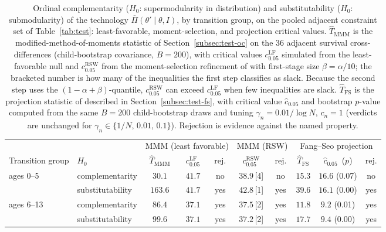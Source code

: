 \begin{table}[htbp]
\centering\small
\begin{tabular}{@{}llcccccccc@{}}
\toprule
 & & \multicolumn{3}{c}{MMM (least favorable)} & \multicolumn{2}{c}{MMM (RSW)} & \multicolumn{3}{c}{Fang--Seo projection} \\
\cmidrule(lr){3-5}\cmidrule(lr){6-7}\cmidrule(lr){8-10}
Transition group & $H_0$ & $\hat T_{\mathrm{MMM}}$ & $c^{\mathrm{LF}}_{0.05}$ & rej. & $c^{\mathrm{RSW}}_{0.05}$ & rej. & $\hat T_{\mathrm{FS}}$ & $\hat c_{0.05}$ \,($p$) & rej. \\ \midrule
ages 0--5 & complementarity & $30.1$ & $41.7$ & no & $38.9$\,[4] & no & $15.3$ & $16.6$ (0.07) & no \\
 & substitutability & $163.6$ & $41.7$ & yes & $42.8$\,[1] & yes & $39.6$ & $16.1$ (0.00) & yes \\
\midrule
ages 6--13 & complementarity & $86.4$ & $37.1$ & yes & $37.5$\,[2] & yes & $11.8$ & $9.2$ (0.01) & yes \\
 & substitutability & $99.6$ & $37.1$ & yes & $37.2$\,[2] & yes & $17.7$ & $9.4$ (0.00) & yes \\
\bottomrule
\end{tabular}
\caption{Ordinal complementarity ($H_0$: supermodularity in distribution) and substitutability ($H_0$: submodularity) of the technology $\overline\Pi(\theta'\mid\theta,I)$, by transition group, on the pooled adjacent constraint set of Table~\ref{tab:test}: least-favorable, moment-selection, and projection critical values. $\hat T_{\mathrm{MMM}}$ is the modified-method-of-moments statistic of
Section~\ref{subsec:test-oc} on the 36 adjacent survival cross-differences
(child-bootstrap covariance, $B=200$), with critical values $c^{\mathrm{LF}}_{0.05}$
simulated from the least-favorable null and $c^{\mathrm{RSW}}_{0.05}$ from the
moment-selection refinement of \citet{Romano_Shaikh_Wolf-2014-ECTA} with first-stage size
$\beta=\alpha/10$; the bracketed number is how many of the inequalities the first step
classifies as slack. Because the second step uses the $(1-\alpha+\beta)$-quantile,
$c^{\mathrm{RSW}}_{0.05}$ can exceed $c^{\mathrm{LF}}_{0.05}$ when few inequalities are
slack. $\hat T_{\mathrm{FS}}$ is the projection statistic of
\citet{Fang_Seo-2021-ECTA} described in Section~\ref{subsec:test-fs}, with critical value
$\hat c_{0.05}$ and bootstrap $p$-value computed from the same $B=200$ child-bootstrap
draws and tuning $\gamma_n=0.01/\log N$, $c_n=1$ (verdicts are unchanged for
$\gamma_n\in\{1/N,\,0.01,\,0.1\}$). Rejection is evidence against the named property.}
\label{tab:test_comparison}
\end{table}
